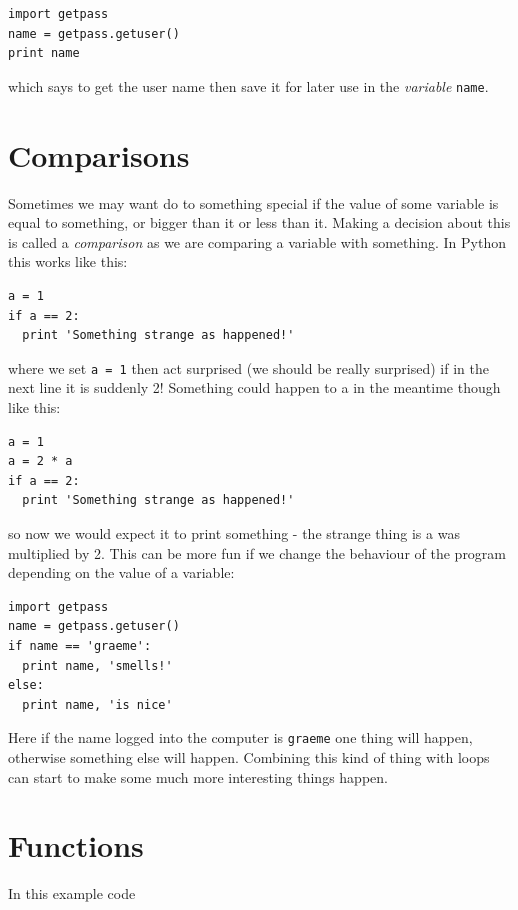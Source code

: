 \documentclass[a4paper, 11pt]{book}
\begin{document}
{\small
\begin{verbatim}
import getpass
name = getpass.getuser()
print name
\end{verbatim}
}

\noindent
which says to get the user name then save it for later use in the
\emph{variable} \verb|name|.

\section{Comparisons}

Sometimes we may want do to something special if the value of some
variable is equal to something, or bigger than it or less than
it. Making a decision about this is called a \emph{comparison} as we
are comparing a variable with something. In Python this works like
this:

{\small
\begin{verbatim}
a = 1
if a == 2:
  print 'Something strange as happened!'
\end{verbatim}
}

\noindent
where we set \verb|a = 1| then act surprised (we should be really
surprised) if in the next line it is suddenly 2! Something could
happen to a in the meantime though like this:

{\small
\begin{verbatim}
a = 1
a = 2 * a
if a == 2:
  print 'Something strange as happened!'
\end{verbatim}
}

\noindent
so now we would expect it to print something - the strange thing is a
was multiplied by 2. This can be more fun if we change the behaviour of
the program depending on the value of a variable:

{\small
\begin{verbatim}
import getpass
name = getpass.getuser()
if name == 'graeme':
  print name, 'smells!'
else:
  print name, 'is nice'
\end{verbatim}
}

Here if the name logged into the computer is \verb|graeme| one thing
will happen, otherwise something else will happen. Combining this kind
of thing with loops can start to make some much more interesting
things happen.

\section{Functions}

In this example code
\end{document}
